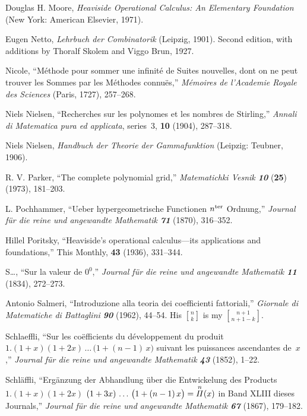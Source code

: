 \bib
[37]\enspace
Douglas H. Moore, {\sl Heaviside Operational Calculus: An Elementary
Foundation\/} (New York: American Elsevier, 1971).

\bib
[38]\enspace
Eugen Netto, {\sl Lehrbuch der Combinatorik\/} (Leipzig, 1901). Second
edition, with additions by Thoralf Skolem and Viggo Brun, 1927.

\bib
[39]\enspace
Nicole, ``M\'ethode pour sommer une infinit\'e de Suites nouvelles,
dont on ne peut trouver les Sommes par les M\'ethodes connu\"es,''
{\sl M\'emoires de l'Academie Royale des Sciences\/} (Paris, 1727),
257--268. 

\bib
[40]\enspace
Niels Nielsen, ``Recherches sur les polynomes et les nombres de
Stirling,''
{\sl Annali di Matematica pura ed applicata}, series~3, {\bf 10}
(1904), 287--318.

\bib
[41]\enspace
Niels Nielsen, {\sl Handbuch der Theorie der Gammafunktion\/}
(Leipzig: Teubner, 1906).

\bib
[42]\enspace
R. V. Parker, ``The complete polynomial grid,'' {\sl Matematichki
Vesnik\/ \bf 10} ({\bf 25}) (1973), 181--203.

\bib
[43]\enspace
L. Pochhammer, ``Ueber hypergeometrische Functionen $n^{\rm ter}$
Ordnung,'' 
{\sl Journal f\"ur die reine und angewandte Mathematik\/
\bf 71} (1870), 316--352.

\bib
[44]\enspace
Hillel Poritsky, ``Heaviside's operational calculus---its applications
and foundations,'' This {\sc Monthly}, {\bf 43} (1936), 331--344.

\bib
[45] \enspace
S{\thinspace}\dots , ``Sur la valeur de $0^0$,'' 
{\sl Journal f\"ur die reine und angewandte Mathematik\/
\bf 11} (1834), 272--273.

\bib
[46]\enspace
Antonio Salmeri, ``Introduzione alla teoria dei coefficienti
fattoriali,'' {\sl Giornale di Matematiche di Battaglini\/ \bf 90}
(1962), 44--54. His ${n\brack k}$ is my ${n+1\brack n+1-k}$.

\bib
[47]\enspace
Schlaeffli, ``Sur les co\"efficients du d\'eveloppement du produit
$1.(1+x)(1+2x)\,\ldots\,\bigl(1+(n-1)\,x\bigr)$ suivant les puissances
ascendantes de~$x$,'' 
{\sl Journal f\"ur die reine und angewandte Mathematik\/
\bf 43} (1852), 1--22.

\bib
[48]\enspace
Schl\"affli, ``Erg\"anzung der Abhandlung \"uber die Entwickelung des
Products 
$1.(1+x)(1+2x)$\allowbreak
$(1+3x)\,\ldots\,\bigl(1+(n-1)\,x\bigr)=
{\displaystyle\mathop{\Piit\null}\limits^n(x)}$
in Band XLIII dieses Journals,''
{\sl Journal f\"ur die reine und angewandte Mathematik\/
\bf 67} (1867), 179--182.

